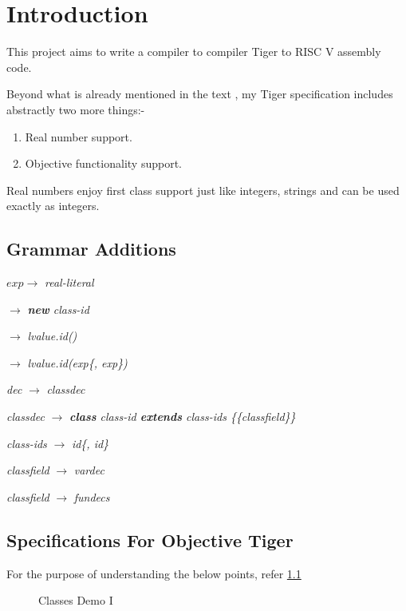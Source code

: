 \chapter{Introduction}

This project aims to write a compiler to compiler Tiger to RISC V assembly code.


Beyond what is already mentioned in the text \cite{tigerbook}, my Tiger specification includes abstractly two more things:-

\begin{enumerate}
	\item Real number support.
	\item Objective functionality support.
\end{enumerate}

Real numbers enjoy first class support just like integers, strings and can be used exactly as integers.

\section{Grammar Additions}

$exp \rightarrow$ \textit{real-literal}

$\rightarrow$ \textit{\textbf{new} class-id}

$\rightarrow$ \textit{lvalue.id()}

$\rightarrow$ \textit{lvalue.id(exp\{, exp\})}

\textit{dec} $\rightarrow$ \textit{classdec}

\textit{classdec} $\rightarrow$ \textit{\textbf{class} class-id \textbf{extends} class-ids \{\{classfield\}\}}

\textit{class-ids} $\rightarrow$ \textit{id\{, id\}}

\textit{classfield} $\rightarrow$ \textit{vardec}

\textit{classfield} $\rightarrow$ \textit{fundecs}

\section{Specifications For Objective Tiger}

For the purpose of understanding the below points, refer \ref{fig:wmi}

\begin{figure}
	\centering
	\caption{Classes Demo I}
	\label{fig:wmi}
\end{figure}

